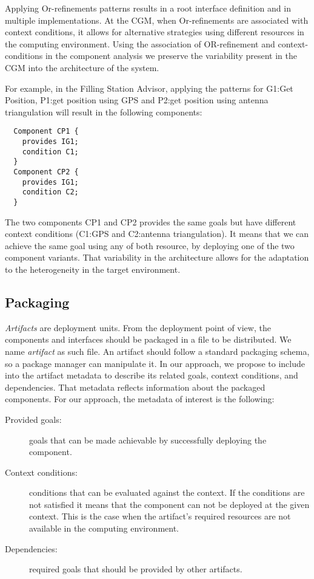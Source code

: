Applying Or-refinements patterns results in a root interface definition and in multiple implementations. At the CGM, when Or-refinements are associated with context conditions, it allows for alternative strategies using different resources in the computing environment. Using the association of OR-refinement and context-conditions in the component analysis we preserve the variability present in the CGM into the architecture of the system.

For example, in the Filling Station Advisor, applying the patterns for G1:Get Position, P1:get position using GPS and P2:get position using antenna triangulation will result in the following components:

\begin{lstlisting}
  Component CP1 {
    provides IG1;
    condition C1;
  }
  Component CP2 {
    provides IG1;
    condition C2;
  }
\end{lstlisting}

The two components CP1 and CP2 provides the same goals but have different context conditions (C1:GPS and C2:antenna triangulation). It means that we can achieve the same goal using any of both resource, by deploying one of the two component variants.
That variability in the architecture allows for the adaptation to the heterogeneity in the target environment.

\subsection{Packaging}
\label{sec_artifacts}
\emph{Artifacts} are deployment units.
From the deployment point of view, the components and interfaces should be packaged in a file to be distributed. We name \emph{artifact} as such file.
An artifact should follow a standard packaging schema, so a package manager can manipulate it.
In our approach, we propose to include into the artifact metadata to describe its related goals, context conditions, and dependencies. That metadata reflects information about the packaged components. For our approach, the metadata of interest is the following:

\begin{description}
  \item[Provided goals:] goals that can be made achievable by successfully deploying the component.
  \item[Context conditions:] conditions that can be evaluated against the context. If the conditions are not satisfied it means that the component can not be deployed at the given context. This is the case when the artifact's required resources are not available in the computing environment.
  \item[Dependencies:] required goals that should be provided by other artifacts.
\end{description}

